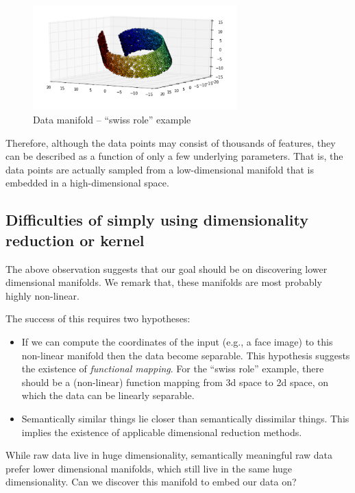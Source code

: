 \begin{figure}[!htbp]
    \centering
    \includegraphics[width=0.7\textwidth]{images/deepLearning/functionalView/swissRoll.png}
    \caption{Data manifold -- ``swiss role'' example}
    \label{fig:swissRoll}
\end{figure}

Therefore, although the data points may consist of thousands of features, they can be described as a function of only a few underlying parameters. That is, the data points are actually sampled from a low-dimensional manifold that is embedded in a high-dimensional space. 

\subsection*{Difficulties of simply using dimensionality reduction or kernel}


The above observation suggests that our goal should be on discovering lower dimensional manifolds. We remark that, these manifolds are most probably highly non-linear. 

The success of this requires two hypotheses: 

\begin{itemize}
    \item If we can compute the coordinates of the input (e.g., a face image) to this non-linear manifold then the data become separable. This hypothesis suggests the existence of \emph{functional mapping}. For the ``swiss role'' example, there should be a (non-linear) function mapping from 3d space to 2d space, on which the data can be linearly separable.
    \item Semantically similar things lie closer than semantically dissimilar things. This implies the existence of applicable dimensional reduction methods. 
\end{itemize}







While raw data live in huge dimensionality, semantically meaningful raw data prefer lower dimensional manifolds, which still live in the same huge dimensionality. 
Can we discover this manifold to embed our data on? 


